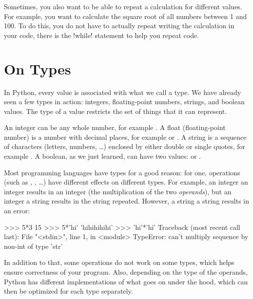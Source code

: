 \documentclass[11pt]{cselabheader}
\begin{document}
Sometimes, you also want to be able to repeat a calculation for different
values. For example, you want to calculate the square root of all numbers
between 1 and 100. To do this, you do not have to actually repeat writing the
calculation in your code, there is the \pythoninline!while! statement to help you
repeat code.

\pagebreak

\tableofcontents

\pagebreak

\section{On Types}

In Python, every value is associated with what we call a type. We have already
seen a few types in action: integers, floating-point numbers, strings, and
boolean values. The type of a value restricts the set of things that it can
represent.

An integer can be any whole number, for example . A
float (floating-point number) is a number with decimal places, for example
 or . A string is a sequence of characters
(letters, numbers, \ldots) enclosed by either double or single quotes, for
example . A boolean, as we just learned, can have
two values:  or .

Most programming languages have types for a good reason: for one, operations
(such as \pythoninline{+}, \pythoninline{-}, \ldots) have different effects on
different types. For example, an integer \pythoninline{*} an integer results in
an integer (the multiplication of the two \emph{operands}), but an integer
\pythoninline{*} a string results in the string repeated. However, a string
\pythoninline{*} a string results in an error:
\begin{pyconcode}
>>> 5*3
15
>>> 5*'hi'
'hihihihihi'
>>> 'hi'*'hi'
Traceback (most recent call last):
  File "<stdin>", line 1, in <module>
TypeError: can't multiply sequence by non-int of type 'str'
\end{pyconcode}

In addition to that, some operations do not work on some types, which helps
ensure correctness of your program. Also, depending on the type of the operands,
Python has different implementations of what goes on under the hood, which can
then be optimized for each type separately.
\end{document}
